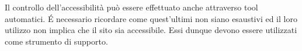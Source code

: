 Il controllo dell'accessibilità può essere effettuato anche attraverso tool automatici. É necessario ricordare come quest'ultimi non siano esaustivi ed il loro utilizzo non implica che il sito sia accessibile.
Essi dunque devono essere utilizzati come strumento di supporto.